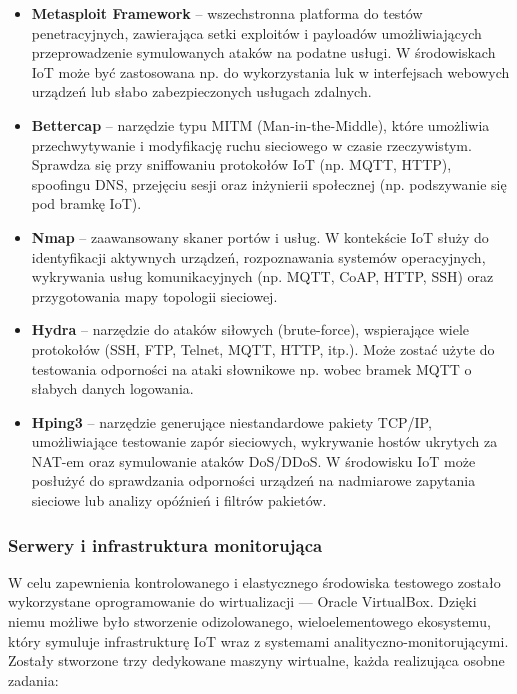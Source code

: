 \begin{itemize}
\item \textbf{Metasploit Framework} – wszechstronna platforma do testów penetracyjnych, zawierająca setki exploitów i payloadów umożliwiających przeprowadzenie symulowanych ataków na podatne usługi. W środowiskach IoT może być zastosowana np. do wykorzystania luk w interfejsach webowych urządzeń lub słabo zabezpieczonych usługach zdalnych.

\item \textbf{Bettercap} – narzędzie typu MITM (Man-in-the-Middle), które umożliwia przechwytywanie i modyfikację ruchu sieciowego w czasie rzeczywistym. Sprawdza się przy sniffowaniu protokołów IoT (np. MQTT, HTTP), spoofingu DNS, przejęciu sesji oraz inżynierii społecznej (np. podszywanie się pod bramkę IoT).

\item \textbf{Nmap} – zaawansowany skaner portów i usług. W kontekście IoT służy do identyfikacji aktywnych urządzeń, rozpoznawania systemów operacyjnych, wykrywania usług komunikacyjnych (np. MQTT, CoAP, HTTP, SSH) oraz przygotowania mapy topologii sieciowej.

\item \textbf{Hydra} – narzędzie do ataków siłowych (brute-force), wspierające wiele protokołów (SSH, FTP, Telnet, MQTT, HTTP, itp.). Może zostać użyte do testowania odporności na ataki słownikowe np. wobec bramek MQTT o słabych danych logowania.

\item \textbf{Hping3} – narzędzie generujące niestandardowe pakiety TCP/IP, umożliwiające testowanie zapór sieciowych, wykrywanie hostów ukrytych za NAT-em oraz symulowanie ataków DoS/DDoS. W środowisku IoT może posłużyć do sprawdzania odporności urządzeń na nadmiarowe zapytania sieciowe lub analizy opóźnień i filtrów pakietów.
\end{itemize}
\subsubsection{Serwery i infrastruktura monitorująca}
W celu zapewnienia kontrolowanego i elastycznego środowiska testowego zostało wykorzystane oprogramowanie do wirtualizacji — Oracle VirtualBox. Dzięki niemu możliwe było stworzenie odizolowanego, wieloelementowego ekosystemu, który symuluje infrastrukturę IoT wraz z systemami analityczno-monitorującymi. Zostały stworzone trzy dedykowane maszyny wirtualne, każda realizująca osobne zadania:

